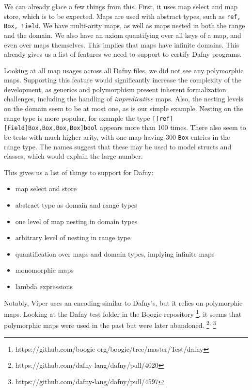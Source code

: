 \documentclass[11pt]{article}
\begin{document}
We can already glace a few things from this.
First, it uses map select and map store, which is to be expected.
Maps are used with abstract types, such as \texttt{ref, Box, Field}.
We have multi-arity maps, as well as maps nested in both the range and the domain.
We also have an axiom quantifying over all keys of a map, and even over maps themselves.
This implies that maps have infinite domains.
This already gives us a list of features we need to support to certify Dafny programs.

Looking at all map usages across all Dafny files,
we did not see any polymorphic maps.
Supporting this feature would significantly increase the complexity of the development, as generics and polymorphism present inherent formalization challenges, %
including the handling of \emph{impredicative} maps. %
Also, the nesting levels on the domain seem to be at most one, as is our simple example.
Nesting on the range type is more popular, for example the type \texttt{[[ref][Field]Box,Box,Box,Box]bool} appears more than 100 times.
There also seem to be tests with much higher arity, with one map having 300 \texttt{Box} entries in the range type.
The names suggest that these may be used to model structs and classes, which would explain the large number.

This gives us a list of things to support for Dafny:
\begin{itemize}
  \item map select and store
  \item abstract type as domain and range types
  \item one level of map nesting in domain types
  \item arbitrary level of nesting in range type
  \item quantification over maps and domain types, implying infinite maps
  \item monomorphic maps
  \item lambda expressions
\end{itemize}

Notably, Viper uses an encoding similar to Dafny's, but it relies on polymorphic maps. %
Looking at the Dafny test folder in the Boogie repository \footnote{https://github.com/boogie-org/boogie/tree/master/Test/dafny},
it seems that polymorphic maps were used in the past but were later abandoned.
\footnote{https://github.com/dafny-lang/dafny/pull/4020}\textsuperscript{,}
\footnote{https://github.com/dafny-lang/dafny/pull/4597}
\end{document}

